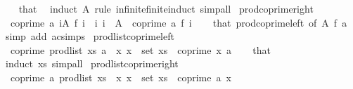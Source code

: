 \begin{isabellebody}
%
\isadelimproof
\ \ %
\endisadelimproof
%
\isatagproof
{}\isamarkupfalse%
\ that\ \isamarkupfalse%
\ {\isacharparenleft}{\kern0pt}induct\ A\ rule{\isacharcolon}{\kern0pt}\ infinite{\isacharunderscore}{\kern0pt}finite{\isacharunderscore}{\kern0pt}induct{\isacharparenright}{\kern0pt}\ simp{\isacharunderscore}{\kern0pt}all%
\endisatagproof
{\isafoldproof}%
%
\isadelimproof
\isanewline
%
\endisadelimproof
\isanewline
{}\isamarkupfalse%
\ prod{\isacharunderscore}{\kern0pt}coprime{\isacharunderscore}{\kern0pt}right{\isacharcolon}{\kern0pt}\isanewline
\ \ {\isachardoublequoteopen}coprime\ a\ {\isacharparenleft}{\kern0pt}{\isasymProd}i{\isasymin}A{\isachardot}{\kern0pt}\ f\ i{\isacharparenright}{\kern0pt}{\isachardoublequoteclose}\ \ {\isachardoublequoteopen}{\isasymAnd}i{\isachardot}{\kern0pt}\ i\ {\isasymin}\ A\ {\isasymLongrightarrow}\ coprime\ a\ {\isacharparenleft}{\kern0pt}f\ i{\isacharparenright}{\kern0pt}{\isachardoublequoteclose}\isanewline
%
\isadelimproof
\ \ %
\endisadelimproof
%
\isatagproof
{}\isamarkupfalse%
\ that\ prod{\isacharunderscore}{\kern0pt}coprime{\isacharunderscore}{\kern0pt}left\ {\isacharbrackleft}{\kern0pt}of\ A\ f\ a{\isacharbrackright}{\kern0pt}\ \isamarkupfalse%
\ {\isacharparenleft}{\kern0pt}simp\ add{\isacharcolon}{\kern0pt}\ ac{\isacharunderscore}{\kern0pt}simps{\isacharparenright}{\kern0pt}%
\endisatagproof
{\isafoldproof}%
%
\isadelimproof
\isanewline
%
\endisadelimproof
\isanewline
{}\isamarkupfalse%
\ prod{\isacharunderscore}{\kern0pt}list{\isacharunderscore}{\kern0pt}coprime{\isacharunderscore}{\kern0pt}left{\isacharcolon}{\kern0pt}\isanewline
\ \ {\isachardoublequoteopen}coprime\ {\isacharparenleft}{\kern0pt}prod{\isacharunderscore}{\kern0pt}list\ xs{\isacharparenright}{\kern0pt}\ a{\isachardoublequoteclose}\ \ {\isachardoublequoteopen}{\isasymAnd}x{\isachardot}{\kern0pt}\ x\ {\isasymin}\ set\ xs\ {\isasymLongrightarrow}\ coprime\ x\ a{\isachardoublequoteclose}\isanewline
%
\isadelimproof
\ \ %
\endisadelimproof
%
\isatagproof
{}\isamarkupfalse%
\ that\ \isamarkupfalse%
\ {\isacharparenleft}{\kern0pt}induct\ xs{\isacharparenright}{\kern0pt}\ simp{\isacharunderscore}{\kern0pt}all%
\endisatagproof
{\isafoldproof}%
%
\isadelimproof
\isanewline
%
\endisadelimproof
\isanewline
{}\isamarkupfalse%
\ prod{\isacharunderscore}{\kern0pt}list{\isacharunderscore}{\kern0pt}coprime{\isacharunderscore}{\kern0pt}right{\isacharcolon}{\kern0pt}\isanewline
\ \ {\isachardoublequoteopen}coprime\ a\ {\isacharparenleft}{\kern0pt}prod{\isacharunderscore}{\kern0pt}list\ xs{\isacharparenright}{\kern0pt}{\isachardoublequoteclose}\ \ {\isachardoublequoteopen}{\isasymAnd}x{\isachardot}{\kern0pt}\ x\ {\isasymin}\ set\ xs\ {\isasymLongrightarrow}\ coprime\ a\ x{\isachardoublequoteclose}\isanewline

\end{isabellebody}

